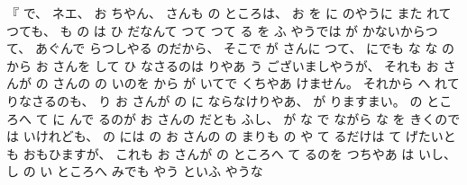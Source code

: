 %
『
で、
%
ネエ、
%
お
ちやん、
%
さんも
の
ところは、
%
お
を
に
のやうに
また
れて
つても、
%
も
の
は
ひ
だなんて
つて
つて
る
を%
ふ
やうでは
が
かないからつて、
%
あぐんで
らつしやる
のだから、
%
そこで
が
さんに
つて、
%
にでも
な
な
の
から
お
さんを
して
ひ
なさるのは
りやあ
う
ございましやうが、
%
それも
お
さんが
の
さんの
の
いのを
から
が
いてで
くちやあ
けません。
%
それから
へ
れて
りなさるのも、
%
%
り
お
さんが
の
に
ならなけりやあ、
%
が%
りますまい。
%
の
ところへ
て
に
んで
るのが
お
さんの
%
だとも
ふし、
%
が
な
で
ながら
な
を
きくのでは
いけれども、
%
の
には
の
お
さんの
の
%
まりも
の
や
て
るだけは
て
げたいとも
おもひますが、
%
これも
お
さんが
の
ところへ
て
るのを
つちやあ
は
いし、
%
し
の
い
ところへ
みでも
やう
といふ
やうな
